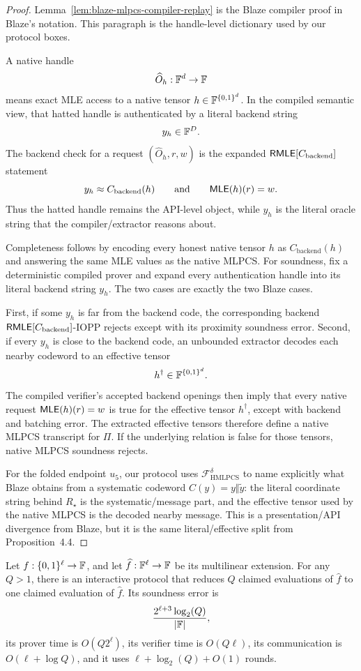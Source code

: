 \begin{proof}
Lemma~\ref{lem:blaze-mlpcs-compiler-replay} is the Blaze compiler proof in
Blaze's notation.  This paragraph is the handle-level dictionary used by our
protocol boxes.

A native handle
\[
  \widehat O_h:\mathbb{F}^d\to\mathbb{F}
\]
means exact MLE access to a native tensor \(h\in\mathbb{F}^{\{0,1\}^d}\).  In the compiled
semantic view, that hatted handle is authenticated by a literal backend string
\[
  y_h\in\mathbb{F}^D.
\]
The backend check for a request \((\widehat O_h,r,w)\) is the expanded
\(\mathsf{RMLE}[C_{\mathrm{backend}}]\) statement
\[
  y_h\approx C_{\mathrm{backend}}(h)
  \qquad\text{and}\qquad
  \mathsf{MLE}(h)(r)=w.
\]
Thus the hatted handle remains the API-level object, while \(y_h\) is the
literal oracle string that the compiler/extractor reasons about.

Completeness follows by encoding every honest native tensor \(h\) as
\(C_{\mathrm{backend}}(h)\) and answering the same MLE values as the native
MLPCS.  For soundness, fix a deterministic compiled prover and expand every
authentication handle into its literal backend string \(y_h\).  The two cases
are exactly the two Blaze cases.

First, if some \(y_h\) is far from the backend code, the corresponding backend
\(\mathsf{RMLE}[C_{\mathrm{backend}}]\)-IOPP rejects except with its proximity
soundness error.  Second, if every \(y_h\) is close to the backend code, an
unbounded extractor decodes each nearby codeword to an effective tensor
\[
  h^\dagger\in\mathbb{F}^{\{0,1\}^d}.
\]
The compiled verifier's accepted backend openings then imply that every native
request \(\mathsf{MLE}(h)(r)=w\) is true for the effective tensor
\(h^\dagger\), except with backend and batching error.  The extracted effective
tensors therefore define a native MLPCS transcript for \(\Pi\).  If the
underlying relation is false for those tensors, native MLPCS soundness rejects.

For the folded endpoint \(u_5\), our protocol uses
\(\mathcal F_{\mathrm{HMLPCS}}^\delta\) to name explicitly what Blaze obtains
from a systematic codeword \(C(y)=y\Vert\widetilde y\): the literal coordinate
string behind \(R_\star\) is the systematic/message part, and the effective
tensor used by the native MLPCS is the decoded nearby message.  This is a
presentation/API divergence from Blaze, but it is the same literal/effective
split from Proposition~4.4.
\end{proof}

\begin{theorem}
\label{thm:blaze-evaluation-batching-input}
Let \(f:\{0,1\}^\ell\to\mathbb{F}\), and let \(\widehat f:\mathbb{F}^\ell\to\mathbb{F}\) be its
multilinear extension.  For any \(Q>1\), there is an interactive protocol that
reduces \(Q\) claimed evaluations of \(\widehat f\) to one claimed evaluation
of \(\widehat f\).  Its soundness error is
\[
  \frac{2^{\ell+3}\log_2(Q)}{|\mathbb{F}|},
\]
its prover time is \(O(Q2^\ell)\), its verifier time is \(O(Q\ell)\), its
communication is \(O(\ell+\log Q)\), and it uses
\(\ell+\log_2(Q)+O(1)\) rounds.
\end{theorem}

